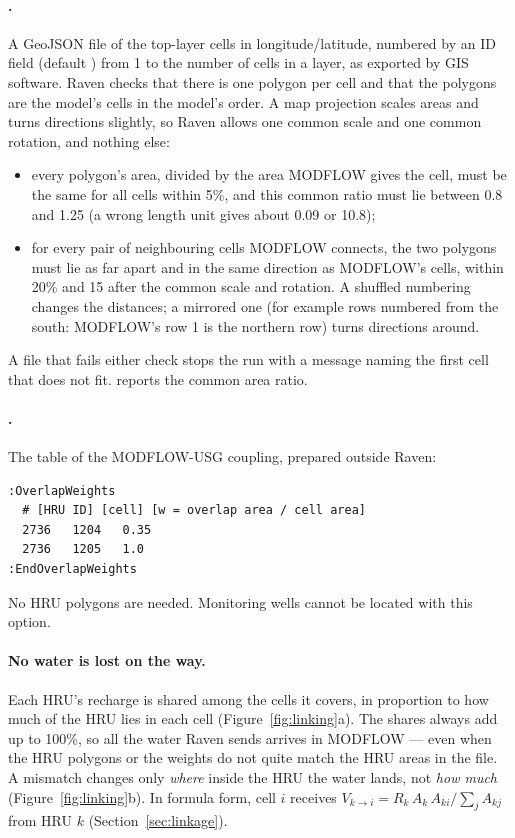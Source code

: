 \paragraph{.} A GeoJSON file of the top-layer cells in longitude/latitude, numbered by an ID field
(default ) from 1 to the number of cells in a layer, as exported by GIS software. Raven checks that there is one
polygon per cell and that the polygons are the model's cells in the model's order. A map projection scales areas and turns
directions slightly, so Raven allows one common scale and one common rotation, and nothing else:
\begin{itemize}
\item every polygon's area, divided by the area MODFLOW gives the cell, must be the same for all cells within 5\%, and this
      common ratio must lie between 0.8 and 1.25 (a wrong length unit gives about 0.09 or 10.8);
\item for every pair of neighbouring cells MODFLOW connects, the two polygons must lie as far apart and in the same direction
      as MODFLOW's cells, within 20\% and 15\textdegree{} after the common scale and rotation. A shuffled numbering changes
      the distances; a mirrored one (for example rows numbered from the south: MODFLOW's row 1 is the northern row) turns
      directions around.
\end{itemize}
A file that fails either check stops the run with a message naming the first cell that does not fit.
 reports the common area ratio.

\paragraph{.} The table of the MODFLOW-USG coupling, prepared outside Raven:
\begin{lstlisting}
:OverlapWeights
  # [HRU ID] [cell] [w = overlap area / cell area]
  2736   1204   0.35
  2736   1205   1.0
:EndOverlapWeights
\end{lstlisting}
No HRU polygons are needed. Monitoring wells cannot be located with this option.

\paragraph{No water is lost on the way.} Each HRU's recharge is shared among the cells it covers, in proportion to how much of
the HRU lies in each cell (Figure~\ref{fig:linking}a). The shares always add up to 100\%, so all the water Raven sends
arrives in MODFLOW --- even when the HRU polygons or the weights do not quite match the HRU areas in the  file. A
mismatch changes only \emph{where} inside the HRU the water lands, not \emph{how much} (Figure~\ref{fig:linking}b). In
formula form, cell $i$ receives $V_{k\to i}=R_k\,A_k\,A_{ki}/\sum_j A_{kj}$ from HRU $k$ (Section~\ref{sec:linkage}).

